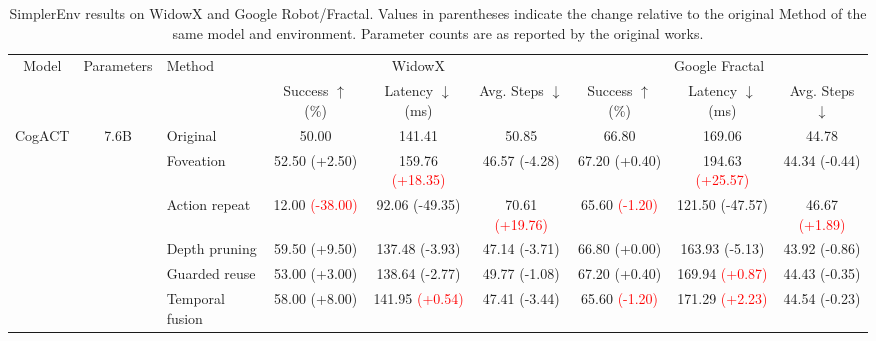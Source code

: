 \begin{table}[t]
\centering
\caption{SimplerEnv results on WidowX and Google Robot/Fractal. Values in parentheses indicate the change relative to the original Method of the same model and environment. Parameter counts are as reported by the original works.}
\label{tab:simplerenv-results}
\small
\setlength{\tabcolsep}{2.2pt}
\begin{tabular}{cclcccccc}
\toprule
\multirow{2}{*}{Model} & \multirow{2}{*}{Parameters} & \multirow{2}{*}{Method}
& \multicolumn{3}{c}{WidowX}
& \multicolumn{3}{c}{Google Fractal} \\
\cmidrule(lr){4-6}
\cmidrule(lr){7-9}
& & & Success $\uparrow$ (\%) & Latency $\downarrow$ (ms) & Avg. Steps $\downarrow$
& Success $\uparrow$ (\%) & Latency $\downarrow$ (ms) & Avg. Steps $\downarrow$ \\
\midrule

\multirow[c]{6}{*}{CogACT}
& \multirow[c]{6}{*}{7.6B}
& Original & 50.00 & 141.41 & 50.85 & 66.80 & 169.06 & 44.78 \\
& & Foveation & 52.50 {\scriptsize\textcolor{green!50!black}{(+2.50)}} & 159.76 {\scriptsize\textcolor{red}{(+18.35)}} & 46.57 {\scriptsize\textcolor{green!50!black}{(-4.28)}} & 67.20 {\scriptsize\textcolor{green!50!black}{(+0.40)}} & 194.63 {\scriptsize\textcolor{red}{(+25.57)}} & 44.34 {\scriptsize\textcolor{green!50!black}{(-0.44)}} \\
& & Action repeat & 12.00 {\scriptsize\textcolor{red}{(-38.00)}} & 92.06 {\scriptsize\textcolor{green!50!black}{(-49.35)}} & 70.61 {\scriptsize\textcolor{red}{(+19.76)}} & 65.60 {\scriptsize\textcolor{red}{(-1.20)}} & 121.50 {\scriptsize\textcolor{green!50!black}{(-47.57)}} & 46.67 {\scriptsize\textcolor{red}{(+1.89)}} \\
& & Depth pruning & 59.50 {\scriptsize\textcolor{green!50!black}{(+9.50)}} & 137.48 {\scriptsize\textcolor{green!50!black}{(-3.93)}} & 47.14 {\scriptsize\textcolor{green!50!black}{(-3.71)}} & 66.80 {\scriptsize\textcolor{green!50!black}{(+0.00)}} & 163.93 {\scriptsize\textcolor{green!50!black}{(-5.13)}} & 43.92 {\scriptsize\textcolor{green!50!black}{(-0.86)}} \\
& & Guarded reuse & 53.00 {\scriptsize\textcolor{green!50!black}{(+3.00)}} & 138.64 {\scriptsize\textcolor{green!50!black}{(-2.77)}} & 49.77 {\scriptsize\textcolor{green!50!black}{(-1.08)}} & 67.20 {\scriptsize\textcolor{green!50!black}{(+0.40)}} & 169.94 {\scriptsize\textcolor{red}{(+0.87)}} & 44.43 {\scriptsize\textcolor{green!50!black}{(-0.35)}} \\
& & Temporal fusion & 58.00 {\scriptsize\textcolor{green!50!black}{(+8.00)}} & 141.95 {\scriptsize\textcolor{red}{(+0.54)}} & 47.41 {\scriptsize\textcolor{green!50!black}{(-3.44)}} & 65.60 {\scriptsize\textcolor{red}{(-1.20)}} & 171.29 {\scriptsize\textcolor{red}{(+2.23)}} & 44.54 {\scriptsize\textcolor{green!50!black}{(-0.23)}} \\
\cmidrule(lr){1-9}


\end{tabular}
\end{table}
